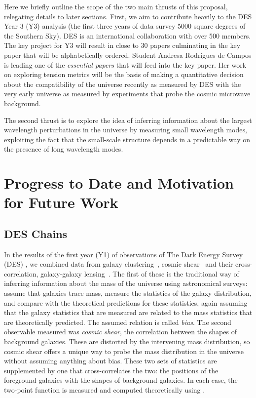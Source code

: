 \documentclass[12pt]{article}
\begin{document}
\begin{small}
Here we briefly outline the scope of the two main thrusts of this proposal, relegating details to later sections. First, we aim to contribute heavily to the DES Year 3 (Y3) analysis (the first three years of data survey 5000 square degrees of the Southern Sky). DES is an international collaboration with over 500 members. The key project for Y3 will result in close to 30 papers culminating in the key paper that will be alphabetically ordered. 
Student Andresa Rodrigues de Campos is leading one of the {\it essential papers} that will feed into the key paper. Her work on exploring tension metrics will be the basis of making a quantitative decision about the compatibility of the universe recently as measured by DES with the very early universe as measured by experiments that probe the cosmic microwave background.

The second thrust is to explore the idea of inferring information about the largest wavelength perturbations in the universe by measuring small wavelength modes, exploiting the fact that the small-scale structure depends in a predictable way on the presence of long wavelength modes.



\section{Progress to Date and Motivation for Future Work}




\subsection{DES Chains}

In the results of the first year (Y1) of observations of The Dark Energy Survey (DES) \cite{Abbott:2017wau}, we combined data from galaxy clustering~\cite{Elvin-Poole:2017xsf}, cosmic shear~\cite{Troxel:2017xyo} and their cross-correlation, galaxy-galaxy lensing~\cite{Prat:2017goa}. The first of these is the traditional way of inferring information about the mass of the universe using astronomical surveys: assume that galaxies trace mass, measure the statistics of the galaxy distribution, and compare with the theoretical predictions for these statistics, again assuming that the galaxy statistics that are measured are related to the mass statistics that are theoretically predicted. The assumed relation is called \emph{bias}. The second observable measured was \emph{cosmic shear}, the correlation between the shapes of background galaxies. These are distorted by the intervening mass distribution, so cosmic shear offers a unique way to probe the mass distribution in the universe without assuming anything about bias. These two sets of statistics are supplemented by one that cross-correlates the two: the positions of the foreground galaxies with the shapes of background galaxies. In each case, the two-point function is measured and computed theoretically using \cosmosis. 



\end{small}
\end{document}
